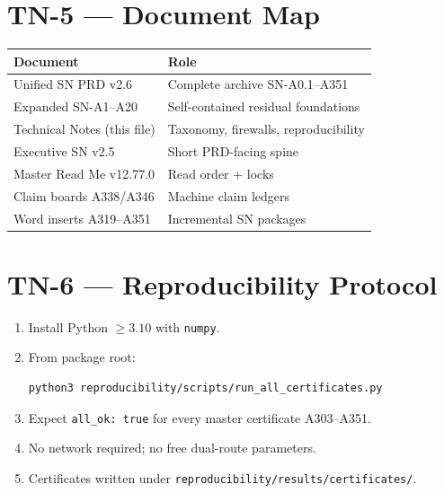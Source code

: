 \documentclass[11pt,a4paper]{article}
\begin{document}
\section{TN-5 --- Document Map}
\begin{center}
\begin{tabular}{@{}p{5.2cm}p{7.0cm}@{}}
\toprule
Document & Role \\
\midrule
Unified SN PRD v2.6 & Complete archive SN-A0.1--A351 \\
Expanded SN-A1--A20 & Self-contained residual foundations \\
Technical Notes (this file) & Taxonomy, firewalls, reproducibility \\
Executive SN v2.5 & Short PRD-facing spine \\
Master Read Me v12.77.0 & Read order + locks \\
Claim boards A338/A346 & Machine claim ledgers \\
Word inserts A319--A351 & Incremental SN packages \\
\bottomrule
\end{tabular}
\end{center}

\section{TN-6 --- Reproducibility Protocol}
\begin{enumerate}[label=(\arabic*)]
\item Install Python $\ge 3.10$ with \texttt{numpy}.
\item From package root:
\begin{verbatim}
python3 reproducibility/scripts/run_all_certificates.py
\end{verbatim}
\item Expect \texttt{all\_ok: true} for every master certificate A303--A351.
\item No network required; no free dual-route parameters.
\item Certificates written under \texttt{reproducibility/results/certificates/}.
\end{enumerate}
\end{document}

